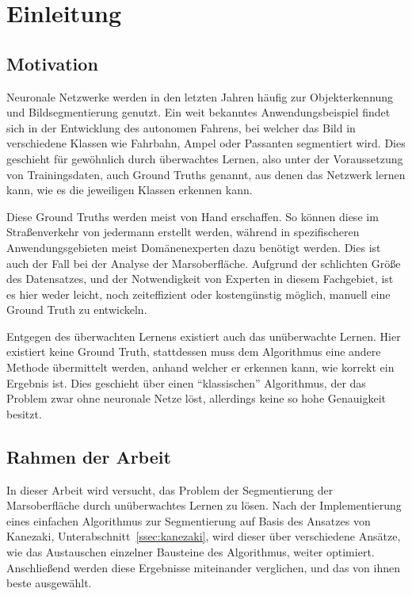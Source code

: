 \chapter{Einleitung}
\label{chap:einleitung}

\section{Motivation}
\label{sec:motivation}

Neuronale Netzwerke werden in den letzten Jahren häufig zur Objekterkennung und Bildsegmentierung genutzt. Ein weit bekanntes Anwendungsbeispiel findet sich in der Entwicklung des autonomen Fahrens, bei welcher das Bild in verschiedene Klassen wie \zB Fahrbahn, Ampel oder Passanten segmentiert wird. Dies geschieht für gewöhnlich durch überwachtes Lernen, also unter der Voraussetzung von Trainingsdaten, auch Ground Truths genannt, aus denen das Netzwerk lernen kann, wie es die jeweiligen Klassen erkennen kann.

Diese Ground Truths werden meist von Hand erschaffen. So können diese im Straßenverkehr von jedermann erstellt werden, während in spezifischeren Anwendungsgebieten meist Domänenexperten dazu benötigt werden. Dies ist auch der Fall bei der Analyse der Marsoberfläche. Aufgrund der schlichten Größe des Datensatzes, und der Notwendigkeit von Experten in diesem Fachgebiet, ist es hier weder leicht, noch zeiteffizient oder kostengünstig möglich, manuell eine Ground Truth zu entwickeln.

Entgegen des überwachten Lernens existiert auch das unüberwachte Lernen. Hier existiert keine Ground Truth, stattdessen muss dem Algorithmus eine andere Methode übermittelt werden, anhand welcher er erkennen kann, wie korrekt ein Ergebnis ist. Dies geschieht \zB über einen \enquote{klassischen} Algorithmus, der das Problem zwar ohne neuronale Netze löst, allerdings keine so hohe Genauigkeit besitzt.

\section{Rahmen der Arbeit}
\label{sec:rahmen}

In dieser Arbeit wird versucht, das Problem der Segmentierung der Marsoberfläche durch unüberwachtes Lernen zu lösen. Nach der Implementierung eines einfachen Algorithmus zur Segmentierung auf Basis des Ansatzes von Kanezaki\cite{kanezaki_18}, \vgl Unterabschnitt~\ref{ssec:kanezaki}, wird dieser über verschiedene Ansätze, wie \zB das Austauschen einzelner Bausteine des Algorithmus, weiter optimiert. Anschließend werden diese Ergebnisse miteinander verglichen, und das von ihnen beste ausgewählt.